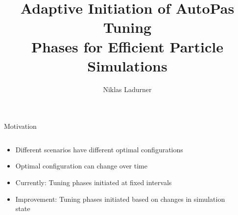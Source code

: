 \newcommand{\fastcolorbar}{%
	\centering
	\begin{tikzpicture}
		\pgfplotscolorbardrawstandalone[
		colorbar,
		colormap name=fast,
		point meta min=0,
		point meta max=50,
		colorbar style={
			height=3cm,
			ytick={0,10,...,50},
			tick align=outside,
			tick pos=right,
		},
		]
	\end{tikzpicture}
	
	\begin{tikzpicture}
		\node[anchor=north, align=center] at (0,0) {\si{F^{*}}};
	\end{tikzpicture}
}

\newcommand{\fastcolorbarhor}{%
	\centering
	\begin{tikzpicture}
		\node[anchor=east, align=center] at (-0.25cm,-0.25cm) {\si{F^{*}}};
		\pgfplotscolorbardrawstandalone[
		colorbar horizontal,
		colormap name=fast,
		point meta min=0,
		point meta max=50,
		colorbar style={
			width=3cm,
			xtick={0,10,...,50},
			tick align=outside,
			tick pos=top,
			xticklabel pos=top,
		},
		]
	\end{tikzpicture}
}


\lstset{
	basicstyle=\ttfamily, 
	numbers=left,
	stepnumber=1,
	showstringspaces=false, 
	tabsize=4,
	breaklines=true, 
	breakatwhitespace=false,
	frame=single,
	captionpos=b, 
}

\graphicspath{ {../thesis/Figures} {../thesis/Figures/scenarios}}



\title{Adaptive Initiation of AutoPas Tuning\\Phases for Efficient Particle Simulations}
\date{}
\author{Niklas Ladurner}



\maketitle

\begin{frame}[c]{Motivation}{}
	\begin{columns}
		\begin{column}{0.6\textwidth}
			\begin{itemize}
				\item Different scenarios have different optimal configurations
				\item Optimal configuration can change over time
				\item Currently: Tuning phases initiated at fixed intervals
				\item Improvement: Tuning phases initiated based on changes in simulation state
			\end{itemize}
		\end{column}
		\begin{column}{0.4\textwidth}
		\end{column}
	\end{columns}
\end{frame}

